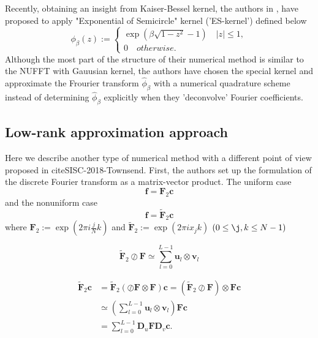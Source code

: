Recently, obtaining an insight from Kaiser-Bessel kernel, the authors in \cite{SISC-2019-Barnett}, \cite{IEEE-2021-Barnett} have proposed to apply "Exponential of Semicircle" kernel ('ES-kernel') defined below
\begin{equation}
  \phi_{\beta}(z) :=
  \begin{cases}
    \exp\left(\beta\sqrt{1-z^2} - 1\right) \quad |z| \le 1,\\
    0 \quad otherwise.
  \end{cases}
  \label{eq:ES-kernel}
\end{equation}
Although the most part of the structure of their numerical method is similar to the NUFFT with Gauusian kernel, the authors have chosen the special kernel and approximate the Frourier transform $\hat{\phi}_{\beta}$ with a numerical quadrature scheme instead of determining $\hat{\phi}_{\beta}$ explicitly when they 'deconvolve' Fourier coefficients.

\subsection{Low-rank approximation approach}
Here we describe another type of numerical method with a different point of view proposed in cite{SISC-2018-Townsend}.
First, the authors set up the formulation of the discrete Fourier transform as a matrix-vector product.
The uniform case
\begin{equation}
  \bm{f} = \bm{F}_{2}\bm{c}
  \label{eq:matrix-vector-product-ufft-type-2}
\end{equation}
and the nonuniform case
\begin{equation}
  \bm{f} = \tilde{\bm{F}}_{2}\bm{c}
  \label{eq:matrix-vector-product-nufft-type-2}
\end{equation}
where
$\bm{F}_{2} := \exp(2\pi i \frac{j}{N}k)$ and
$\tilde{\bm{F}}_{2} := \exp(2\pi i x_{j}k)$
$(0 \le \j, k \le N-1)$

\begin{equation}
  \tilde{\bm{F}}_{2}\oslash\bm{F} \simeq
  \sum_{l=0}^{L-1}\bm{u}_{l}\otimes\bm{v}_{l}
\end{equation}

\begin{align}
     \tilde{\bm{F}}_{2}\bm{c}
  &= \tilde{\bm{F}}_{2}\left(\oslash\bm{F}\otimes\bm{F}\right)\bm{c}
   = \left(\tilde{\bm{F}}_{2}\oslash\bm{F}\right)\otimes\bm{F}\bm{c} \\
  &\simeq \left(\sum_{l=0}^{L-1}\bm{u}_{l}\otimes\bm{v}_{l}\right)\bm{F}\bm{c} \\
  &= \sum_{l=0}^{L-1} \bm{D}_{u}\bm{F}\bm{D}_{v}\bm{c}.
\end{align}


